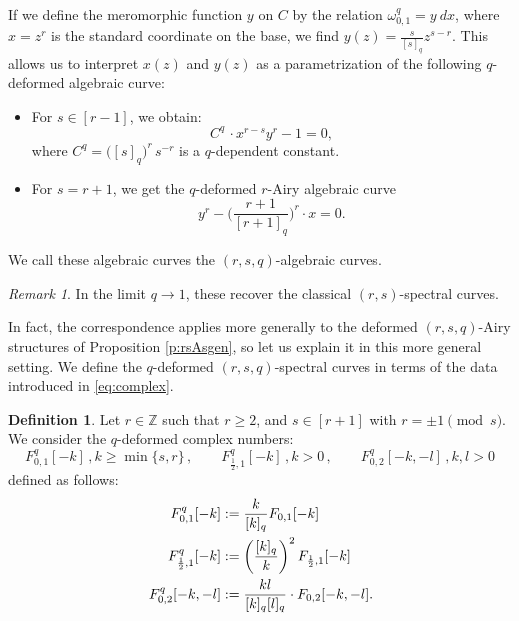 \documentclass[reqno,11pt]{amsart}
\theoremstyle{plain}
\theoremstyle{definition}
\newtheorem{definition}[theorem]{Definition}
\theoremstyle{remark}
\newtheorem{remark}[theorem]{Remark}
\numberwithin{equation}{section}
\newcommand{\1}{\mathds{1}}
\newcommand{\2}{\frac{1}{2}}
\begin{document}
{								If we define the meromorphic function $y$ on $C$ by the relation $\omega^{q}_{0,1} = y\ dx$, where $x=z^r$ is the standard coordinate on the base, we find $y(z) = \frac{s}{[s]_q} z^{s-r}$. This allows us to interpret $x(z)$ and $y(z)$ as a parametrization of the following $q$-deformed algebraic curve: 
								\begin{itemize}
									\item[(i)] For $s\in[r-1]$, we obtain:
									\begin{equation}\label{eq:rsac1}
										C^q\,\cdot x^{r-s} y^r - 1 = 0,
									\end{equation}
									where $C^q=\big([s]_q\big)^{r}\,s^{-r}$ is a $q$-dependent constant.
									\item[(ii)]For $s=r+1$, we get the $q$-deformed $r$-Airy algebraic curve
									\begin{equation}\label{eq:rsac2}
										y^r - \bigg(\frac{r+1}{[r+1]_q}\bigg)^{r}\cdot x =0.
									\end{equation}
								\end{itemize}
								We call these algebraic curves the $(r,s,q)$-algebraic curves.
								\begin{remark}
									In the limit $q\rightarrow 1$, these recover the classical $(r,s)$-spectral curves.
								\end{remark}
								
								In fact, the correspondence applies more generally to the deformed $(r,s,q)$-Airy structures of Proposition \ref{p:rsAsgen}, so let us explain it in this more general setting.
								We define the $q$-deformed $(r,s,q)$-spectral curves in terms of the data introduced in \eqref{eq:complex}.
								\begin{definition}
									Let $r  \in \mathbb{Z}$ such that $r \geq 2$, and $s \in [r+1]$ with $r = \pm 1 \pmod{s}$. We consider the $q$-deformed complex numbers:
									\begin{equation}
										F^{q}_{0,1}[-k]\,, k \geq \min \{ s, r\} \,, \qquad F^{q}_{\frac{1}{2},1}[-k]\,, k > 0\,, \qquad F^{q}_{0,2}[-k,-l] \,, k,l > 0
									\end{equation}
									defined as follows:
									\begin{align}
										\,	F^{q}_{0,1}[-k]&:={k\over [k]_q}F_{0,1}[-k]\label{F1}\\\,F^{q}_{\frac{1}{2},1}[-k] &:= \left(\frac{[k]_q}{k} \right)^2 F_{\frac{1}{2},1}[-k]\label{F2}\\\,F_{0,2}^{q}[-k,-l] &:= \frac{k l}{[k]_q [l]_q}\cdot F_{0,2}[-k,-l]\label{F3}.
									\end{align}
								\end{definition}
								
}
\end{document}
